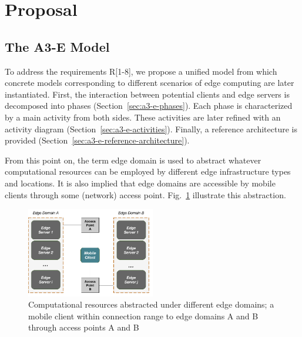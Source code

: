 \section{Proposal}\label{sec:proposal}



\subsection{The A3-E Model}

To address the requirements R[1-8], we propose a unified model from which concrete models corresponding to different scenarios of edge computing are later instantiated. First, the interaction between potential clients and edge servers is decomposed into phases (Section~\ref{sec:a3-e-phases}). Each phase is characterized by a main activity from both sides. These activities are later refined with an activity diagram (Section~\ref{sec:a3-e-activities}). Finally, a reference architecture is provided (Section~\ref{sec:a3-e-reference-architecture}).


From this point on, the term edge domain is used to abstract whatever computational resources can be employed by different edge infrastructure types and locations. It is also implied that edge domains are accessible by mobile clients through some (network) access point. Fig.~\ref{fig:edge-domain-client} illustrate this abstraction.

\begin{figure}
  \includegraphics[width=0.5\textwidth]{figs/edge-domain-client.png}
  \caption{Computational resources abstracted under different edge domains; a mobile client within connection range to edge domains A and B through access points A and B}
  \label{fig:edge-domain-client}
\end{figure}

